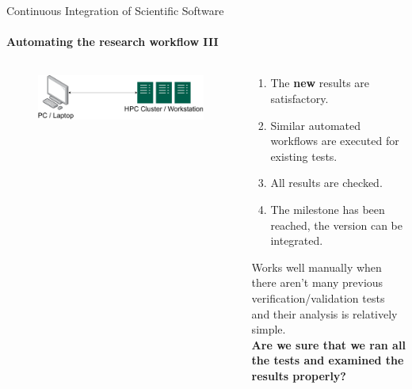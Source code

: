 \begin{frame}{Continuous Integration of Scientific Software}
    \framesubtitle{Automating the research workflow III} 
    \vfill

        \begin{columns}
            \begin{column}[c]{0.5\textwidth}
                \begin{figure}
                    \centering
                    \includegraphics[width=\columnwidth]{figures/workflow-overview.png}
                \end{figure}
            \end{column}
            \begin{column}[c]{0.5\textwidth}
                \begin{enumerate} 
                    \item The \textbf{new} results are satisfactory. 
                    \item Similar automated workflows are executed for existing tests. 
                    \item All results are checked. 
                    \item The milestone has been reached, the version can be integrated.
                \end{enumerate}
                Works well manually when there aren't many previous verification/validation tests and their analysis is relatively simple.\\
                \textbf{Are we sure that we ran all the tests and examined the results properly?}
                
            \end{column}
        \end{columns}
\end{frame}

